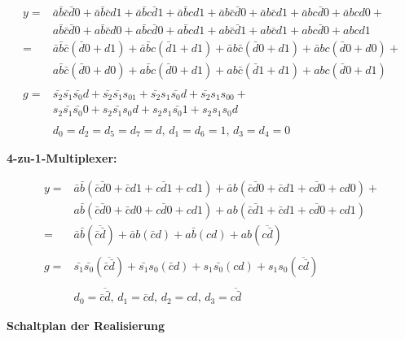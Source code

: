 \documentclass[fleqn]{article}
\begin{document}
\begin{equation}
\begin{aligned}
 y =& \bar{a}\bar{b}\bar{c}\bar{d}0 + \bar{a}\bar{b}\bar{c}d1 + \bar{a}\bar{b}c\bar{d}1 + \bar{a}\bar{b}cd1 +
 \bar{a}b\bar{c}\bar{d}0 + \bar{a}b\bar{c}d1 + \bar{a}bc\bar{d}0 + \bar{a}bcd0+\\
 &a\bar{b}\bar{c}\bar{d}0 + a\bar{b}\bar{c}d0 + a\bar{b}c\bar{d}0 + a\bar{b}cd1+
 ab\bar{c}\bar{d}1 + ab\bar{c}d1 + abc\bar{d}0 + abcd1\\
 =&\bar{a}\bar{b}\bar{c}(\bar{d}0+d1) + \bar{a}\bar{b}c(\bar{d}1+d1) + \bar{a}b\bar{c}(\bar{d}0+d1) + \bar{a}bc(\bar{d}0+d0)+\\
 &a\bar{b}\bar{c}(\bar{d}0+d0) + a\bar{b}c(\bar{d}0+d1)+ ab\bar{c}(\bar{d}1+d1)+abc(\bar{d}0+d1)\\
 \\
 g =&\bar{s_2}\bar{s_1}\bar{s_0}d+\bar{s_2}\bar{s_1}s_01+\bar{s_2}s_1\bar{s_0}d+\bar{s_2}s_1s_00+\\
 &s_2\bar{s_1}\bar{s_0}0+s_2\bar{s_1}s_0d+s_2s_1\bar{s_0}1+s_2s_1s_0d\\
 \\
 & d_0 = d_2 = d_5 = d_7 = d ,\, d_1 = d_6 = 1,\, d_3 = d_4 = 0
\end{aligned}
\end{equation}

\textbf{4-zu-1-Multiplexer:}

\begin{equation}
    \begin{aligned}
        y =& \bar{a}\bar{b}(\bar{c}\bar{d}0+\bar{c}d1+c\bar{d}1+cd1) + \bar{a}b(\bar{c}\bar{d}0+\bar{c}d1+c\bar{d}0+cd0)+\\
        &a\bar{b}(\bar{c}\bar{d}0+\bar{c}d0+c\bar{d}0+cd1)+ ab(\bar{c}\bar{d}1+\bar{c}d1+c\bar{d}0+cd1)\\
        =& \bar{a}\bar{b}(\overline{\bar{c}\bar{d}}) + \bar{a}b(\bar{c}d) + a\bar{b}(cd) + ab(\overline{c\bar{d}})\\
        \\
        g=& \bar{s_1}\bar{s_0}(\overline{\bar{c}\bar{d}}) + \bar{s_1}s_0(\bar{c}d) + s_1\bar{s_0}(cd) + s_1s_0(\overline{c\bar{d}})\\
        \\
        &d_0=\overline{\bar{c}\bar{d}},\, d_1=\bar{c}d,\, d_2=cd ,\, d_3=\overline{c\bar{d}}
    \end{aligned}
\end{equation}


\textbf{Schaltplan der Realisierung}
\end{document}
